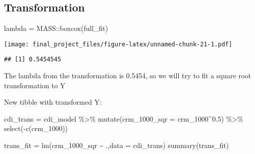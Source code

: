 \documentclass[
]{article}
\newenvironment{Shaded}{\begin{snugshade}}{\end{snugshade}}
\newcommand{\AttributeTok}[1]{\textcolor[rgb]{0.77,0.63,0.00}{#1}}
\newcommand{\FloatTok}[1]{\textcolor[rgb]{0.00,0.00,0.81}{#1}}
\newcommand{\FunctionTok}[1]{\textcolor[rgb]{0.00,0.00,0.00}{#1}}
\newcommand{\NormalTok}[1]{#1}
\newcommand{\OtherTok}[1]{\textcolor[rgb]{0.56,0.35,0.01}{#1}}
\newcommand{\SpecialCharTok}[1]{\textcolor[rgb]{0.00,0.00,0.00}{#1}}
\begin{document}
\hypertarget{transformation}{%
\subsection{Transformation}\label{transformation}}

\begin{Shaded}
\begin{Highlighting}[]
\NormalTok{lambda }\OtherTok{=}\NormalTok{ MASS}\SpecialCharTok{::}\FunctionTok{boxcox}\NormalTok{(full\_fit)}
\end{Highlighting}
\end{Shaded}

\texttt{[image: final\_project\_files/figure-latex/unnamed-chunk-21-1.pdf]}

\begin{Shaded}
\end{Shaded}

\begin{verbatim}
## [1] 0.5454545
\end{verbatim}

The lambda from the transformation is 0.5454, so we will try to fit a
square root transformation to Y

New tibble with transformed Y:

\begin{Shaded}
\begin{Highlighting}[]
\NormalTok{cdi\_trans }\OtherTok{=}\NormalTok{ cdi\_model }\SpecialCharTok{\%\textgreater{}\%} \FunctionTok{mutate}\NormalTok{(}\AttributeTok{crm\_1000\_sqr =}\NormalTok{ crm\_1000}\SpecialCharTok{\^{}}\FloatTok{0.5}\NormalTok{) }\SpecialCharTok{\%\textgreater{}\%} \FunctionTok{select}\NormalTok{(}\SpecialCharTok{{-}}\FunctionTok{c}\NormalTok{(crm\_1000))}
\end{Highlighting}
\end{Shaded}

\begin{Shaded}
\begin{Highlighting}[]
\NormalTok{trans\_fit }\OtherTok{=} \FunctionTok{lm}\NormalTok{(crm\_1000\_sqr }\SpecialCharTok{\textasciitilde{}}\NormalTok{ .,}\AttributeTok{data =}\NormalTok{ cdi\_trans)}
\FunctionTok{summary}\NormalTok{(trans\_fit)}
\end{Highlighting}
\end{Shaded}
\end{document}
